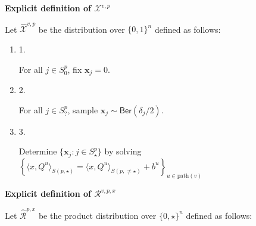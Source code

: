 \documentclass[10pt,a4paper]{article}
\begin{document}
\par\medskip\noindent\textbf{Explicit definition of $\mathcal{X}^{v,p}$
}\par




Let $\widehat{\mathcal{X}}^{v,p}$ be the distribution over $\{0,1\}^{n}$ defined as follows:\par


\begin{enumerate}


\item[] 
1. 


For all $j\in S^{p}_{0}$, fix $\bm{x}_{j}=0$.\par





\item[] 
2. 


For all $j\in S^{p}_{\mathord{?}}$, sample $\bm{x}_{j}\sim\mathsf{Ber}(\delta_{j}/2)$.\par





\item[] 
3. 


Determine $\{\bm{x}_{j}\colon j\in S^{p}_{\star}\}$ by solving $\left\{\langle x,Q^{u}\rangle_{S(p,\star)}=\langle x,Q^{u}\rangle_{S(p,\neq\star)}+b^{u}\right\}_{u\in\mathrm{path}(v)}$\par





\end{enumerate}





\par\medskip\noindent\textbf{Explicit definition of $\mathcal{R}^{v,p,x}$
}\par




Let $\widehat{\mathcal{R}}^{p,x}$ be the product distribution over $\{0,\star\}^{n}$ defined as follows:\par
\end{document}
